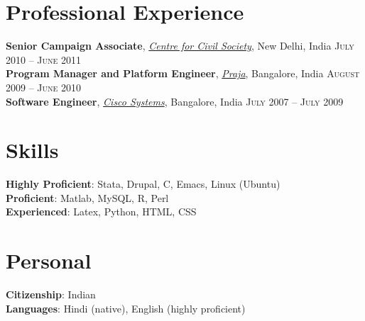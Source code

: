 \documentclass[11pt]{article}
\begin{document}
\section{Professional Experience}
\label{sec-5}
\flushleft
\textbf{Senior Campaign Associate}, \emph{\href{http://ccs.in}{Centre for Civil Society}}, New Delhi,
India \hfill \textsc{\normalsize July 2010 -- June 2011}\\
\vspace{0.6em}
\textbf{Program Manager and Platform Engineer}, \emph{\href{http://praja.in}{Praja}}, Bangalore, India
 \hfill \textsc{\normalsize August 2009 -- June 2010}\\
\vspace{0.6em}
\textbf{Software Engineer}, \emph{\href{http://www.cisco.com}{Cisco Systems}}, Bangalore, India \hfill \textsc{\normalsize July 2007 -- July 2009}\\

\section{Skills}
\label{sec-6}
\textbf{Highly Proficient}: Stata, Drupal, C, Emacs, Linux (Ubuntu) \\
\textbf{Proficient}: Matlab, MySQL, R, Perl \\
\textbf{Experienced}: Latex, Python, HTML, CSS \\

\section{Personal}
\label{sec-7}
\textbf{Citizenship}: Indian \\
\textbf{Languages}: Hindi (native), English (highly proficient)\\
\end{document}
